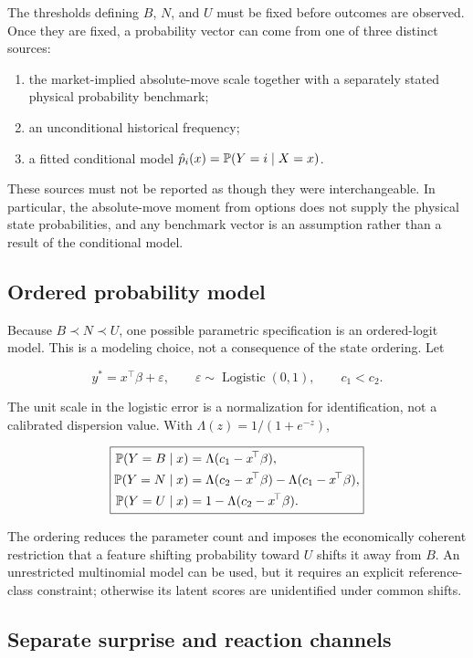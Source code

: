 The thresholds defining $B$, $N$, and $U$ must be fixed before outcomes are
observed. Once they are fixed, a probability vector can come from one of three
distinct sources:

\begin{enumerate}
\item the market-implied absolute-move scale together with a separately stated
      physical probability benchmark;
\item an unconditional historical frequency;
\item a fitted conditional model $\hat p_i(x)=\mathbb{P}(Y=i\mid X=x)$.
\end{enumerate}

These sources must not be reported as though they were interchangeable. In
particular, the absolute-move moment from options does not supply the physical
state probabilities, and any benchmark vector is an assumption rather than a
result of the conditional model.

\subsection{Ordered probability model}

Because $B\prec N\prec U$, one possible parametric specification is an
ordered-logit model. This is a modeling choice, not a consequence of the state
ordering. Let

\[
y^*=x^{\!\top}\beta+\varepsilon,
\qquad
\varepsilon\sim\operatorname{Logistic}(0,1),
\qquad c_1<c_2.
\]

The unit scale in the logistic error is a normalization for identification, not
a calibrated dispersion value. With $\Lambda(z)=1/(1+e^{-z})$,

\[
\boxed{
\begin{aligned}
\mathbb{P}(Y=B\mid x)&=\Lambda(c_1-x^{\!\top}\beta),\\
\mathbb{P}(Y=N\mid x)&=\Lambda(c_2-x^{\!\top}\beta)-\Lambda(c_1-x^{\!\top}\beta),\\
\mathbb{P}(Y=U\mid x)&=1-\Lambda(c_2-x^{\!\top}\beta).
\end{aligned}}
\]

The ordering reduces the parameter count and imposes the economically coherent
restriction that a feature shifting probability toward $U$ shifts it away from
$B$. An unrestricted multinomial model can be used, but it requires an explicit
reference-class constraint; otherwise its latent scores are unidentified under
common shifts.

\subsection{Separate surprise and reaction channels}

